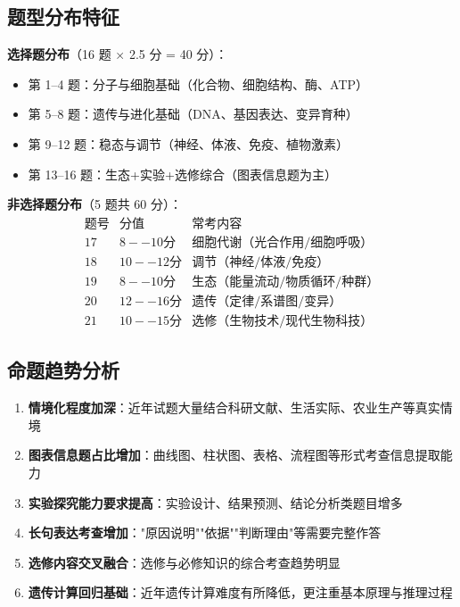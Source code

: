 \subsection{题型分布特征}

\textbf{选择题分布}（16 题 × 2.5 分 = 40 分）：
\begin{itemize}
  \item 第 1--4 题：分子与细胞基础（化合物、细胞结构、酶、ATP）
  \item 第 5--8 题：遗传与进化基础（DNA、基因表达、变异育种）
  \item 第 9--12 题：稳态与调节（神经、体液、免疫、植物激素）
  \item 第 13--16 题：生态+实验+选修综合（图表信息题为主）
\end{itemize}

\textbf{非选择题分布}（5 题共 60 分）：
\[
\begin{array}{c|c|c}
\text{题号} & \text{分值} & \text{常考内容} \\ \hline
17 & 8--10 分 & 细胞代谢（光合作用/细胞呼吸） \\
18 & 10--12 分 & 调节（神经/体液/免疫） \\
19 & 8--10 分 & 生态（能量流动/物质循环/种群） \\
20 & 12--16 分 & 遗传（定律/系谱图/变异） \\
21 & 10--15 分 & 选修（生物技术/现代生物科技）
\end{array}
\]

\subsection{命题趋势分析}

\begin{enumerate}
  \item \textbf{情境化程度加深}：近年试题大量结合科研文献、生活实际、农业生产等真实情境
  \item \textbf{图表信息题占比增加}：曲线图、柱状图、表格、流程图等形式考查信息提取能力
  \item \textbf{实验探究能力要求提高}：实验设计、结果预测、结论分析类题目增多
  \item \textbf{长句表达考查增加}："原因说明""依据""判断理由"等需要完整作答
  \item \textbf{选修内容交叉融合}：选修与必修知识的综合考查趋势明显
  \item \textbf{遗传计算回归基础}：近年遗传计算难度有所降低，更注重基本原理与推理过程
\end{enumerate}

